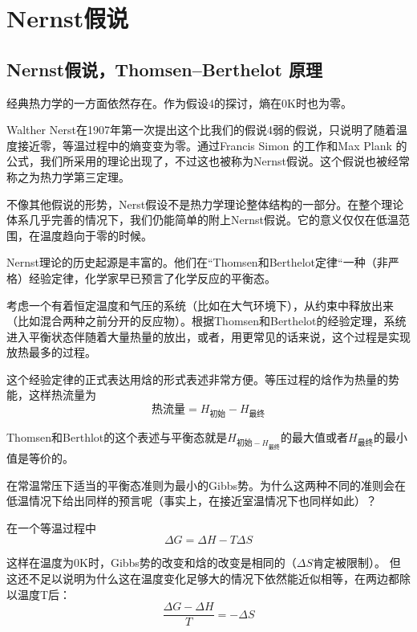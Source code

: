 \usepackage{CJK}
\chapter{Nernst假说}
\label{chap11}

\section{Nernst假说，Thomsen–Berthelot 原理}
\label{sec11.1}
经典热力学的一方面依然存在。作为假设4的探讨，熵在0K时也为零。

Walther Nerst在1907年第一次提出这个比我们的假说4弱的假说，只说明了随着温度接近零，等温过程中的熵变变为零。通过Francis Simon 的工作和Max Plank 的公式，我们所采用的理论出现了，不过这也被称为Nernst假说。这个假说也被经常称之为热力学第三定理。

不像其他假说的形势，Nerst假设不是热力学理论整体结构的一部分。在整个理论体系几乎完善的情况下，我们仍能简单的附上Nernst假说。它的意义仅仅在低温范围，在温度趋向于零的时候。

Nernst理论的历史起源是丰富的。他们在“Thomsen和Berthelot定律“一种（非严格）经验定律，化学家早已预言了化学反应的平衡态。

考虑一个有着恒定温度和气压的系统（比如在大气环境下），从约束中释放出来（比如混合两种之前分开的反应物）。根据Thomsen和Berthelot的经验定理，系统进入平衡状态伴随着大量热量的放出，或者，用更常见的话来说，这个过程是实现放热最多的过程。

这个经验定律的正式表达用焓的形式表述非常方便。等压过程的焓作为热量的势能，这样热流量为
\begin{equation}
	\text{热流量}= H_{\text{初始}}-H_{\text{最终}}	
\end{equation}

Thomsen和Berthlot的这个表述与平衡态就是$H_{\text{初始}-H_{\text{最终}}}$的最大值或者$H_{\text{最终}}$的最小值是等价的。

在常温常压下适当的平衡态准则为最小的Gibbs势。为什么这两种不同的准则会在低温情况下给出同样的预言呢（事实上，在接近室温情况下也同样如此）？

在一个等温过程中
\begin{equation}
	\Delta G= \Delta H- T\Delta S	
\end{equation}

这样在温度为0K时，Gibbs势的改变和焓的改变是相同的（$\Delta S$肯定被限制）。 但这还不足以说明为什么这在温度变化足够大的情况下依然能近似相等，在两边都除以温度T后：
\begin{equation}
	\frac{\Delta G- \Delta H}{T}=- \Delta S	
\end{equation}

